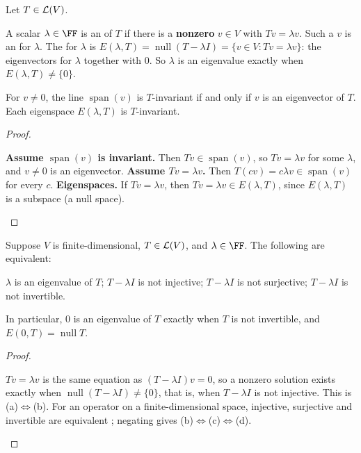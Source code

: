 \documentclass[10pt]{scrartcl}
\DeclareMathOperator{\spn}{span}\DeclareMathOperator{\nul}{null}\DeclareMathOperator{\range}{range}
\begin{document}
\begin{definition*}
  Let $T\in\mathcal L(V)$.
  \begin{itemize}
    \ii A scalar $\lambda\in\FF$ is an  of $T$ if there is a \textbf{nonzero} $v\in V$ with $Tv = \lambda v$. Such a $v$ is an  for $\lambda$.
    \ii The  for $\lambda$ is $E(\lambda, T) = \nul(T - \lambda I) = \{v\in V : Tv = \lambda v\}$: the eigenvectors for $\lambda$ together with $0$. So $\lambda$ is an eigenvalue exactly when $E(\lambda,T)\ne\{0\}$.
  \end{itemize}
\end{definition*}

\begin{proposition*}
  For $v\ne0$, the line $\spn(v)$ is $T$-invariant if and only if $v$ is an eigenvector of $T$. Each eigenspace $E(\lambda,T)$ is $T$-invariant.
\end{proposition*}
\begin{proof}
  \begin{steps}
    \ii \textbf{Assume $\spn(v)$ is invariant.} Then $Tv\in\spn(v)$, so $Tv=\lambda v$ for some $\lambda$, and $v\ne0$ is an eigenvector.
    \ii \textbf{Assume $Tv=\lambda v$.} Then $T(cv)=c\lambda v\in\spn(v)$ for every $c$.
    \ii \textbf{Eigenspaces.} If $Tv=\lambda v$, then $Tv=\lambda v\in E(\lambda,T)$, since $E(\lambda,T)$ is a subspace (a null space).
  \end{steps}
\end{proof}

\begin{proposition*}
  Suppose $V$ is finite-dimensional, $T\in\mathcal L(V)$, and $\lambda\in\FF$. The following are equivalent:
  \begin{enumerate}[(a)]
    \ii $\lambda$ is an eigenvalue of $T$;
    \ii $T-\lambda I$ is not injective;
    \ii $T-\lambda I$ is not surjective;
    \ii $T-\lambda I$ is not invertible.
  \end{enumerate}
  In particular, $0$ is an eigenvalue of $T$ exactly when $T$ is not invertible, and $E(0,T)=\nul T$.
\end{proposition*}
\begin{proof}
  \begin{steps}
    \ii $Tv=\lambda v$ is the same equation as $(T-\lambda I)v=0$, so a nonzero solution exists exactly when $\nul(T-\lambda I)\ne\{0\}$, that is, when $T-\lambda I$ is not injective. This is (a)$\iff$(b).
    \ii For an operator on a finite-dimensional space, injective, surjective and invertible are equivalent ; negating gives (b)$\iff$(c)$\iff$(d).
  \end{steps}
\end{proof}
\end{document}
